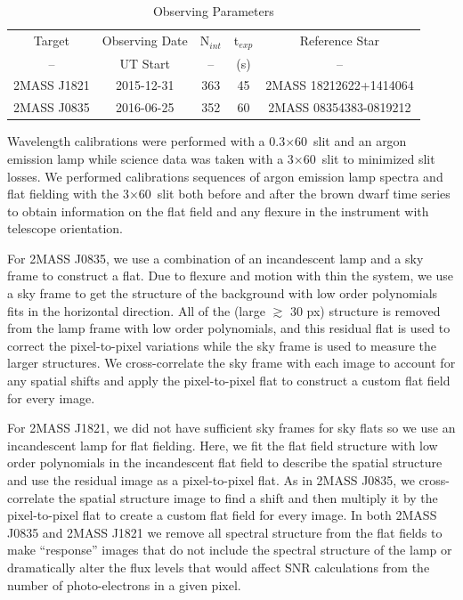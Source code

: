 \documentclass[twocolumn]{aastex6}
\begin{document}
\begin{table}
\begin{center}
\caption{Observing Parameters}\label{tab:obsParam}
\begin{tabular}{ccccc}
Target & Observing Date & N$_{int}$ & t$_{exp}$ & Reference Star \\
-- & UT Start & -- & (s) & -- \\
\hline
2MASS J1821 & 2015-12-31 & 363 & 45 & 2MASS 18212622+1414064 \\
2MASS J0835 & 2016-06-25 & 352 & 60 & 2MASS 08354383-0819212 \\
\end{tabular}
\end{center}
\tablenotetext{}{}
\end{table}


Wavelength calibrations were performed with a 0.3$\times$60\arcsec\ slit and an argon emission lamp while science data was taken with a 3$\times$60\arcsec\ slit to minimized slit losses.
We performed calibrations sequences of argon emission lamp spectra and flat fielding with the 3$\times$60\arcsec\ slit both before and after the brown dwarf time series to obtain information on the flat field and any flexure in the instrument with telescope orientation.

For 2MASS J0835, we use a combination of an incandescent lamp and a sky frame to construct a flat.
Due to flexure and motion with thin the system, we use a sky frame to get the structure of the background with low order polynomials fits in the horizontal direction.
All of the (large $\gtrsim$ 30 px) structure is removed from the lamp frame with low order polynomials, and this residual flat is used to correct the pixel-to-pixel variations while the sky frame is used to measure the larger structures.
We cross-correlate the sky frame with each image to account for any spatial shifts and apply the pixel-to-pixel flat to construct a custom flat field for every image.

For 2MASS J1821, we did not have sufficient sky frames for sky flats so we use an incandescent lamp for flat fielding.
Here, we fit the flat field structure with low order polynomials in the incandescent flat field to describe the spatial structure and use the residual image as a pixel-to-pixel flat.
As in 2MASS J0835, we cross-correlate the spatial structure image to find a shift and then multiply it by the pixel-to-pixel flat to create a custom flat field for every image.
In both 2MASS J0835 and 2MASS J1821 we remove all spectral structure from the flat fields to make ``response'' images that do not include the spectral structure of the lamp or dramatically alter the flux levels that would affect SNR calculations from the number of photo-electrons in a given pixel.
\end{document}
